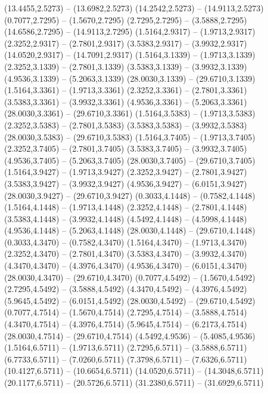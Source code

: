 {\begin{scope}[shift={(#1,#2)}]
    (13.4455,2.5273) -- (13.6982,2.5273)
    (14.2542,2.5273) -- (14.9113,2.5273)
    (0.7077,2.7295) -- (1.5670,2.7295)
    (2.7295,2.7295) -- (3.5888,2.7295)
    (14.6586,2.7295) -- (14.9113,2.7295)
    (1.5164,2.9317) -- (1.9713,2.9317)
    (2.3252,2.9317) -- (2.7801,2.9317)
    (3.5383,2.9317) -- (3.9932,2.9317)
    (14.0520,2.9317) -- (14.7091,2.9317)
    (1.5164,3.1339) -- (1.9713,3.1339)
    (2.3252,3.1339) -- (2.7801,3.1339)
    (3.5383,3.1339) -- (3.9932,3.1339)
    (4.9536,3.1339) -- (5.2063,3.1339)
    (28.0030,3.1339) -- (29.6710,3.1339)
    (1.5164,3.3361) -- (1.9713,3.3361)
    (2.3252,3.3361) -- (2.7801,3.3361)
    (3.5383,3.3361) -- (3.9932,3.3361)
    (4.9536,3.3361) -- (5.2063,3.3361)
    (28.0030,3.3361) -- (29.6710,3.3361)
    (1.5164,3.5383) -- (1.9713,3.5383)
    (2.3252,3.5383) -- (2.7801,3.5383)
    (3.5383,3.5383) -- (3.9932,3.5383)
    (28.0030,3.5383) -- (29.6710,3.5383)
    (1.5164,3.7405) -- (1.9713,3.7405)
    (2.3252,3.7405) -- (2.7801,3.7405)
    (3.5383,3.7405) -- (3.9932,3.7405)
    (4.9536,3.7405) -- (5.2063,3.7405)
    (28.0030,3.7405) -- (29.6710,3.7405)
    (1.5164,3.9427) -- (1.9713,3.9427)
    (2.3252,3.9427) -- (2.7801,3.9427)
    (3.5383,3.9427) -- (3.9932,3.9427)
    (4.9536,3.9427) -- (6.0151,3.9427)
    (28.0030,3.9427) -- (29.6710,3.9427)
    (0.3033,4.1448) -- (0.7582,4.1448)
    (1.5164,4.1448) -- (1.9713,4.1448)
    (2.3252,4.1448) -- (2.7801,4.1448)
    (3.5383,4.1448) -- (3.9932,4.1448)
    (4.5492,4.1448) -- (4.5998,4.1448)
    (4.9536,4.1448) -- (5.2063,4.1448)
    (28.0030,4.1448) -- (29.6710,4.1448)
    (0.3033,4.3470) -- (0.7582,4.3470)
    (1.5164,4.3470) -- (1.9713,4.3470)
    (2.3252,4.3470) -- (2.7801,4.3470)
    (3.5383,4.3470) -- (3.9932,4.3470)
    (4.3470,4.3470) -- (4.3976,4.3470)
    (4.9536,4.3470) -- (6.0151,4.3470)
    (28.0030,4.3470) -- (29.6710,4.3470)
    (0.7077,4.5492) -- (1.5670,4.5492)
    (2.7295,4.5492) -- (3.5888,4.5492)
    (4.3470,4.5492) -- (4.3976,4.5492)
    (5.9645,4.5492) -- (6.0151,4.5492)
    (28.0030,4.5492) -- (29.6710,4.5492)
    (0.7077,4.7514) -- (1.5670,4.7514)
    (2.7295,4.7514) -- (3.5888,4.7514)
    (4.3470,4.7514) -- (4.3976,4.7514)
    (5.9645,4.7514) -- (6.2173,4.7514)
    (28.0030,4.7514) -- (29.6710,4.7514)
    (4.5492,4.9536) -- (5.4085,4.9536)
    (1.5164,6.5711) -- (1.9713,6.5711)
    (2.7295,6.5711) -- (3.5888,6.5711)
    (6.7733,6.5711) -- (7.0260,6.5711)
    (7.3798,6.5711) -- (7.6326,6.5711)
    (10.4127,6.5711) -- (10.6654,6.5711)
    (14.0520,6.5711) -- (14.3048,6.5711)
    (20.1177,6.5711) -- (20.5726,6.5711)
    (31.2380,6.5711) -- (31.6929,6.5711)

\end{scope}}
